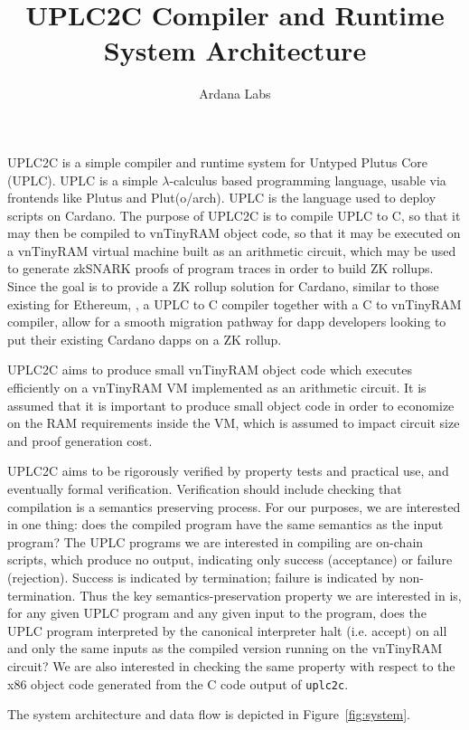 \documentclass[12pt]{article}
\title{UPLC2C Compiler and Runtime System Architecture}
\author{Ardana Labs}
\begin{document}
\maketitle

UPLC2C is a simple compiler and runtime system for Untyped Plutus Core (UPLC). UPLC is a simple $\lambda$-calculus based programming language, usable via frontends like Plutus \cite{plutus} and Plut(o/arch). \cite{pluto,plutarch} UPLC is the language used to deploy scripts on Cardano. The purpose of UPLC2C is to compile UPLC to C, so that it may then be compiled to vnTinyRAM \cite{vntinyram} object code, so that it may be executed on a vnTinyRAM virtual machine built as an arithmetic circuit, which may be used to generate zkSNARK proofs of program traces in order to build ZK rollups. Since the goal is to provide a ZK rollup solution for Cardano, similar to those existing for Ethereum, \cite{ethworks-20}, a UPLC to C compiler together with a C to vnTinyRAM compiler, allow for a smooth migration pathway for dapp developers looking to put their existing Cardano dapps on a ZK rollup.

UPLC2C aims to produce small vnTinyRAM object code which executes efficiently on a vnTinyRAM VM implemented as an arithmetic circuit. It is assumed that it is important to produce small object code in order to economize on the RAM requirements inside the VM, which is assumed to impact circuit size and proof generation cost. 

UPLC2C aims to be rigorously verified by property tests and practical use, and eventually formal verification. Verification should include checking that compilation is a semantics preserving process. For our purposes, we are interested in one thing: does the compiled program have the same semantics as the input program? The UPLC programs we are interested in compiling are on-chain scripts, which produce no output, indicating only success (acceptance) or failure (rejection). Success is indicated by termination; failure is indicated by non-termination. Thus the key semantics-preservation property we are interested in is, for any given UPLC program and any given input to the program, does the UPLC program interpreted by the canonical interpreter halt (i.e. accept) on all and only the same inputs as the compiled version running on the vnTinyRAM circuit? We are also interested in checking the same property with respect to the x86 object code generated from the C code output of \texttt{uplc2c}.

The system architecture and data flow is depicted in Figure~\ref{fig:system}.
\end{document}
